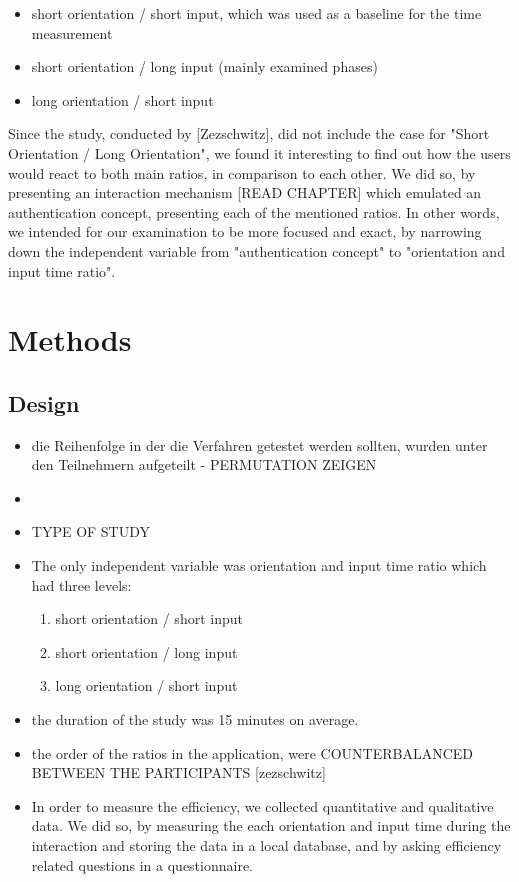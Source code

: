 \begin{itemize}
    \item short orientation / short input, which was used as a baseline for the time measurement
    \item short orientation / long input (mainly examined phases)
    \item long orientation / short input
\end{itemize}

Since the study, conducted by [Zezschwitz], did not include the case for "Short Orientation / Long Orientation", we found it interesting to find out how the users would react to both main ratios, in comparison to each other. We did so, by presenting an interaction mechanism [READ CHAPTER] which emulated an authentication concept, presenting each of the mentioned ratios. In other words, we intended for our examination to be more focused and exact, by narrowing down the independent variable from "authentication concept" to "orientation and input time ratio". 


\section{Methods}


\subsection{Design}

\begin{itemize}
    \item die Reihenfolge in der die Verfahren getestet werden sollten, wurden unter den Teilnehmern aufgeteilt - PERMUTATION ZEIGEN
    \item 
\end{itemize}




\begin{itemize}
    \item TYPE OF STUDY 
    \item The only independent variable was orientation and input time ratio which had three levels:
    
    \begin{enumerate}
        \item short orientation / short input
        \item short orientation / long input
        \item long orientation / short input
    \end{enumerate}
    
    \item the duration of the study was 15 minutes on average. 
    \item the order of the ratios in the application, were COUNTERBALANCED BETWEEN THE PARTICIPANTS [zezschwitz]
    \item In order to measure the efficiency, we collected quantitative and qualitative data. We did so, by measuring the each orientation and input time during the interaction and storing the data in a local database, and by asking efficiency related questions in a questionnaire.
\end{itemize}



